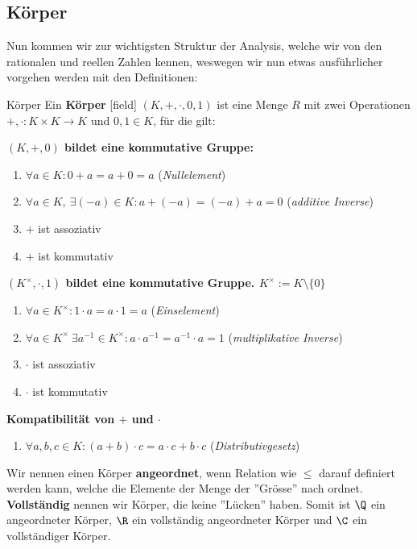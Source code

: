 \subsection{Körper}
Nun kommen wir zur wichtigsten Struktur der Analysis, welche wir von den rationalen und reellen Zahlen kennen, weswegen wir nun etwas ausführlicher vorgehen werden mit den Definitionen:
\begin{definition}{Körper}{}
Ein \textbf{Körper} [field] $(K, +, \cdot,0, 1)$ ist eine Menge $R$ mit zwei Operationen $+,\cdot: K \times K \to K$ und $0, 1 \in K$, für die gilt:

\textbf{$(K, +,0)$ bildet eine kommutative Gruppe:}
\begin{enumerate}[label={K\arabic*)}]
    \item $\forall a \in K: 0+a = a + 0 = a$ \hfill (\textit{Nullelement})
    \item $\forall a \in K, \ \exists (-a) \in K: a + (-a) = (-a) + a = 0$ \hfill (\textit{additive Inverse})
    \item $+$ ist assoziativ
    \item $+$ ist kommutativ
\end{enumerate}
\textbf{$(K^\times, \cdot,1)$ bildet eine kommutative Gruppe. $K^\times := K\setminus\{0\}$}
\begin{enumerate}[resume, label={K\arabic*)}]
    \item $\forall a \in K^\times: 1 \cdot a = a \cdot 1 = a$ \hfill (\textit{Einselement})
    \item $\forall a \in K^\times \ \exists a^{-1} \in K^\times: a \cdot a^{-1} = a^{-1} \cdot a = 1$ \hfill (\textit{multiplikative Inverse})
    \item $\cdot$ ist assoziativ
    \item $\cdot$ ist kommutativ
\end{enumerate}
\textbf{Kompatibilität von $+$ und $\cdot$}
\begin{enumerate}[resume, label=K\arabic*)]
    \item $\forall a,b,c \in K: (a + b) \cdot c = a \cdot c + b \cdot c$ \hfill (\textit{Distributivgesetz})
\end{enumerate}
\end{definition}

\begin{remark}
Wir nennen einen Körper \textbf{angeordnet}, wenn Relation wie $\leq$ darauf definiert werden kann, welche die Elemente der Menge der ''Grösse'' nach ordnet. \textbf{Vollständig} nennen wir Körper, die keine ''Lücken'' haben. Somit ist $\Q$ ein angeordneter Körper, $\R$ ein vollständig angeordneter Körper und $\C$ ein vollständiger  Körper.
\end{remark}

